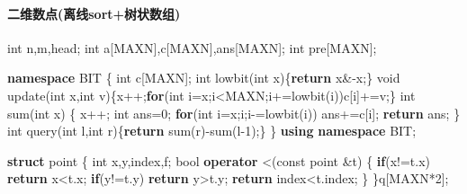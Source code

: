 \documentclass[
]{article}
\newenvironment{Shaded}{}{}
\newcommand{\AttributeTok}[1]{\textcolor[rgb]{0.49,0.56,0.16}{#1}}
\newcommand{\ControlFlowTok}[1]{\textcolor[rgb]{0.00,0.44,0.13}{\textbf{#1}}}
\newcommand{\DataTypeTok}[1]{\textcolor[rgb]{0.56,0.13,0.00}{#1}}
\newcommand{\DecValTok}[1]{\textcolor[rgb]{0.25,0.63,0.44}{#1}}
\newcommand{\KeywordTok}[1]{\textcolor[rgb]{0.00,0.44,0.13}{\textbf{#1}}}
\newcommand{\NormalTok}[1]{#1}
\begin{document}
\hypertarget{ux4e8cux7ef4ux6570ux70b9ux79bbux7ebfsortux6811ux72b6ux6570ux7ec4}{%
\paragraph{二维数点(离线sort+树状数组)}\label{ux4e8cux7ef4ux6570ux70b9ux79bbux7ebfsortux6811ux72b6ux6570ux7ec4}}

\begin{Shaded}
\begin{Highlighting}[]
\DataTypeTok{int}\NormalTok{ n,m,head;}
\DataTypeTok{int}\NormalTok{ a[MAXN],c[MAXN],ans[MAXN];}
\DataTypeTok{int}\NormalTok{ pre[MAXN];}

\KeywordTok{namespace}\NormalTok{ BIT}
\NormalTok{\{}
    \DataTypeTok{int}\NormalTok{ c[MAXN];}
    \DataTypeTok{int}\NormalTok{ lowbit(}\DataTypeTok{int}\NormalTok{ x)\{}\ControlFlowTok{return}\NormalTok{ x\&{-}x;\}}
    \DataTypeTok{void}\NormalTok{ update(}\DataTypeTok{int}\NormalTok{ x,}\DataTypeTok{int}\NormalTok{ v)\{x++;}\ControlFlowTok{for}\NormalTok{(}\DataTypeTok{int}\NormalTok{ i=x;i\textless{}MAXN;i+=lowbit(i))c[i]+=v;\}}
    \DataTypeTok{int}\NormalTok{ sum(}\DataTypeTok{int}\NormalTok{ x)}
\NormalTok{    \{}
\NormalTok{        x++;}
        \DataTypeTok{int}\NormalTok{ ans=}\DecValTok{0}\NormalTok{;}
        \ControlFlowTok{for}\NormalTok{(}\DataTypeTok{int}\NormalTok{ i=x;i;i{-}=lowbit(i))}
\NormalTok{            ans+=c[i];}
        \ControlFlowTok{return}\NormalTok{ ans;}
\NormalTok{    \}}
    \DataTypeTok{int}\NormalTok{ query(}\DataTypeTok{int}\NormalTok{ l,}\DataTypeTok{int}\NormalTok{ r)\{}\ControlFlowTok{return}\NormalTok{ sum(r){-}sum(l{-}}\DecValTok{1}\NormalTok{);\}}
\NormalTok{\}}
\KeywordTok{using} \KeywordTok{namespace}\NormalTok{ BIT;}

\KeywordTok{struct}\NormalTok{ point }
\NormalTok{\{}
    \DataTypeTok{int}\NormalTok{ x,y,index,f;}
    \DataTypeTok{bool} \KeywordTok{operator}\NormalTok{ \textless{}(}\AttributeTok{const}\NormalTok{ point \&t)}
\NormalTok{    \{}
        \ControlFlowTok{if}\NormalTok{(x!=t.x) }\ControlFlowTok{return}\NormalTok{ x\textless{}t.x;}
        \ControlFlowTok{if}\NormalTok{(y!=t.y) }\ControlFlowTok{return}\NormalTok{ y\textgreater{}t.y;}
        \ControlFlowTok{return}\NormalTok{ index\textless{}t.index;}
\NormalTok{    \}}
\NormalTok{\}q[MAXN*}\DecValTok{2}\NormalTok{];}


\end{Highlighting}
\end{Shaded}
\end{document}
